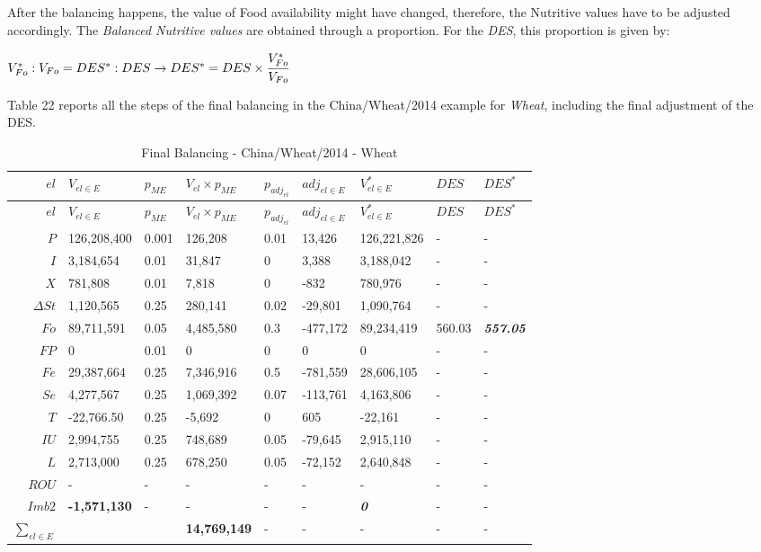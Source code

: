 \documentclass[]{article}
\begin{document}
After the balancing happens, the value of Food availability might have
changed, therefore, the Nutritive values have to be adjusted
accordingly. The \emph{Balanced Nutritive values} are obtained through a
proportion. For the \emph{DES}, this proportion is given by:

\(V^*_{Fo} : V_{Fo} = DES^* : DES \rightarrow DES^* = DES \times \cfrac{V^*_{Fo}}{V_{Fo}}\)

Table 22 reports all the steps of the final balancing in the
China/Wheat/2014 example for \emph{Wheat}, including the final
adjustment of the DES.

\begin{longtable}[]{@{}rllllllll@{}}
\caption{Final Balancing - China/Wheat/2014 - Wheat}\tabularnewline
\toprule
\boldmath\(el\) & \boldmath\(V_{el \in E}\) & \boldmath\(p_{ME}\) &
\boldmath\(V_{el} \times p_{ME}\) & \boldmath\(p_{adj_{el}}\) &
\boldmath\(adj_{el \in E}\) & \boldmath\(V^*_{el \in E}\) &
\boldmath\(DES\) & \boldmath\(DES^*\)\tabularnewline
\midrule
\endfirsthead
\toprule
\boldmath\(el\) & \boldmath\(V_{el \in E}\) & \boldmath\(p_{ME}\) &
\boldmath\(V_{el} \times p_{ME}\) & \boldmath\(p_{adj_{el}}\) &
\boldmath\(adj_{el \in E}\) & \boldmath\(V^*_{el \in E}\) &
\boldmath\(DES\) & \boldmath\(DES^*\)\tabularnewline
\midrule
\endhead
\(P\) & 126,208,400 & 0.001 & 126,208 & 0.01 & 13,426 & 126,221,826 & -
& -\tabularnewline
\(I\) & 3,184,654 & 0.01 & 31,847 & 0 & 3,388 & 3,188,042 & - &
-\tabularnewline
\(X\) & 781,808 & 0.01 & 7,818 & 0 & -832 & 780,976 & - &
-\tabularnewline
\(\Delta St\) & 1,120,565 & 0.25 & 280,141 & 0.02 & -29,801 & 1,090,764
& - & -\tabularnewline
\(Fo\) & 89,711,591 & 0.05 & 4,485,580 & 0.3 & -477,172 & 89,234,419 &
560.03 & \textbf{\emph{557.05}}\tabularnewline
\(FP\) & 0 & 0.01 & 0 & 0 & 0 & 0 & - & -\tabularnewline
\(Fe\) & 29,387,664 & 0.25 & 7,346,916 & 0.5 & -781,559 & 28,606,105 & -
& -\tabularnewline
\(Se\) & 4,277,567 & 0.25 & 1,069,392 & 0.07 & -113,761 & 4,163,806 & -
& -\tabularnewline
\(T\) & -22,766.50 & 0.25 & -5,692 & 0 & 605 & -22,161 & - &
-\tabularnewline
\(IU\) & 2,994,755 & 0.25 & 748,689 & 0.05 & -79,645 & 2,915,110 & - &
-\tabularnewline
\(L\) & 2,713,000 & 0.25 & 678,250 & 0.05 & -72,152 & 2,640,848 & - &
-\tabularnewline
\(ROU\) & - & - & - & - & - & - & - & -\tabularnewline
\boldmath\(Imb2\) & \textbf{-1,571,130} & - & - & - & - &
\textbf{\emph{0}} & - & -\tabularnewline
\boldmath\(\sum \limits_{el \in E}\) & & & \textbf{14,769,149} & - & - &
- & - & -\tabularnewline
\bottomrule
\end{longtable}
\end{document}
